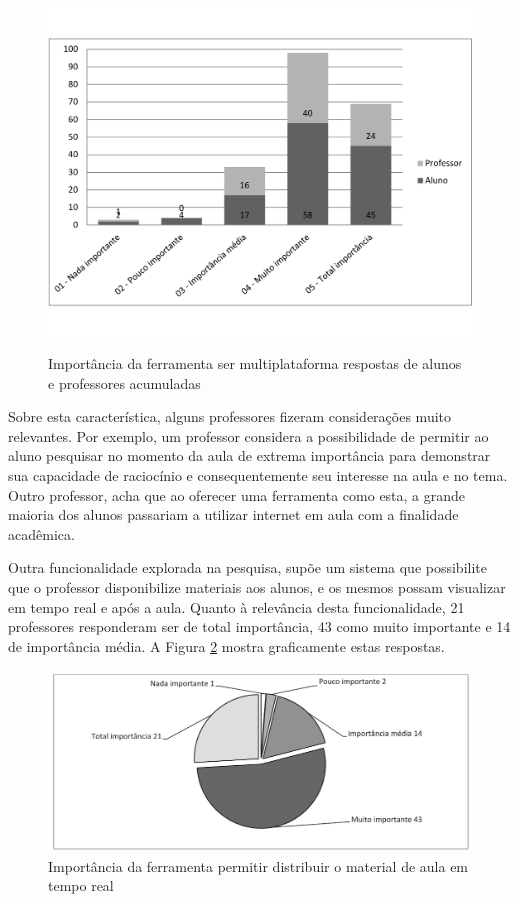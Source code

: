 \begin{figure}[!h]
\centering
\caption{Importância da ferramenta ser multiplataforma respostas de alunos e professores acumuladas}
\includegraphics[width=1.0\textwidth]{pesquisa/multiplataforma-acumulativo.pdf} 
\label{fig:grafico_multiplataforma_acumulativo} 
\end{figure}

Sobre esta característica, alguns professores fizeram considerações muito relevantes. Por exemplo, um professor considera a possibilidade de permitir ao aluno pesquisar no momento da aula de extrema importância para demonstrar sua capacidade de raciocínio e consequentemente seu interesse na aula e no tema. Outro professor, acha que ao oferecer uma ferramenta como esta, a grande maioria dos alunos passariam a utilizar internet em aula com a finalidade acadêmica.

Outra funcionalidade explorada na pesquisa, supõe um sistema que possibilite que o professor disponibilize materiais aos alunos, e os mesmos possam visualizar em tempo real e após a aula. Quanto à relevância desta funcionalidade, 21 professores responderam ser de total importância, 43 como muito importante e 14 de importância média. A Figura \ref{fig:grafico_conteudos} mostra graficamente estas respostas.

\begin{figure}[!h]
\centering
\includegraphics[width=1.0\textwidth]{pdfs/professores/img-grafico-visualizar-conteudo.pdf} 
\caption{Importância da ferramenta permitir distribuir o material de aula em tempo real}
\label{fig:grafico_conteudos} 
\end{figure}

